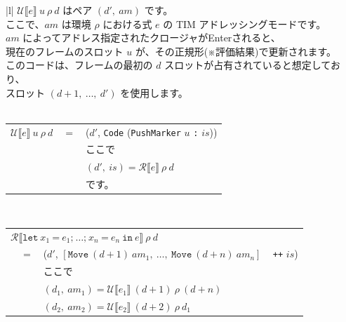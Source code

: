 \documentclass{jbook}
\begin{document}
\begin{tabular} {|l|} \hline
	$\mathcal{U} \llbracket e \rrbracket ~ u ~ \rho ~ d$ はペア $(d', ~ am)$ です。 \\
	ここで、$am$ は環境 $\rho$ における式 $e$ の TIM アドレッシングモードです。     \\
	$am$ によってアドレス指定されたクロージャがEnterされると、                      \\
	現在のフレームのスロット $u$ が、その正規形(※評価結果)で更新されます。          \\
	このコードは、フレームの最初の $d$ スロットが占有されていると想定しており、     \\
	スロット $(d + 1, ~ \ldots, ~ d')$ を使用します。                               \\
	\\
	\begin{tabular}{r c l}
		$\mathcal{U} \llbracket e \rrbracket ~ u ~ \rho ~ d$ & $=$ & ($d'$, \texttt{Code} (\texttt{PushMarker} $u$ \texttt{:} $is$)) \\
		                                                     &     & ここで                                                          \\
		                                                     &     & $(d', ~ is) = \mathcal{R} \llbracket e \rrbracket ~ \rho ~ d$   \\
		                                                     &     & です。
	\end{tabular}
	\\ \hline
	\begin{tabular}{r c l}
		\multicolumn{3}{l}{$\mathcal{R} \llbracket \texttt{let} ~ x_1 ~ \texttt{=} ~ e_1\texttt{;} ~  \ldots \texttt{;} ~ x_n ~ \texttt{=} ~ e_n ~ \texttt{in} ~ e \rrbracket ~ \rho ~ d$} \\
		 & $=$ & ($d'$, $\left[ \texttt{Move} ~ (d + 1) ~ am_1, ~ \ldots, ~ \texttt{Move} ~ (d + n) ~ am_n \right]$ ~ \texttt{++} $is$)                                                    \\
		 &     & ここで                                                                                                                                                                    \\
		 &     & $(d_1, ~ am_1) = \mathcal{U} \llbracket e_1 \rrbracket ~ (d + 1) ~ \rho ~ (d + n)$                                                                                        \\
		 &     & $(d_2, ~ am_2) = \mathcal{U} \llbracket e_2 \rrbracket ~ (d + 2) ~ \rho ~ d_1$                                                                                            \\

\end{tabular}
\end{tabular}
\end{document}
